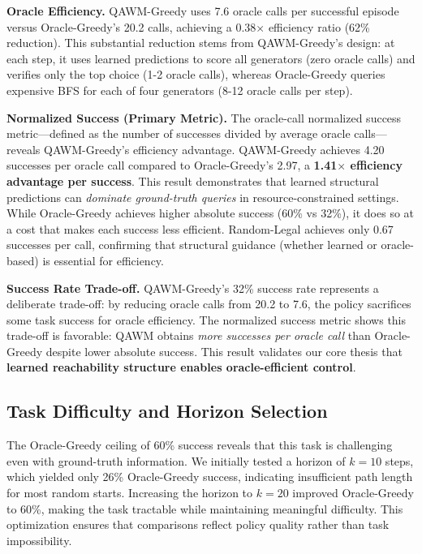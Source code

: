 \textbf{Oracle Efficiency.} QAWM-Greedy uses 7.6 oracle calls per successful episode versus Oracle-Greedy's 20.2 calls, achieving a 0.38$\times$ efficiency ratio (62\% reduction). This substantial reduction stems from QAWM-Greedy's design: at each step, it uses learned predictions to score all generators (zero oracle calls) and verifies only the top choice (1-2 oracle calls), whereas Oracle-Greedy queries expensive BFS for each of four generators (8-12 oracle calls per step).

\textbf{Normalized Success (Primary Metric).} The oracle-call normalized success metric—defined as the number of successes divided by average oracle calls—reveals QAWM-Greedy's efficiency advantage. QAWM-Greedy achieves 4.20 successes per oracle call compared to Oracle-Greedy's 2.97, a \textbf{1.41$\times$ efficiency advantage per success}. This result demonstrates that learned structural predictions can \textit{dominate ground-truth queries} in resource-constrained settings. While Oracle-Greedy achieves higher absolute success (60\% vs 32\%), it does so at a cost that makes each success less efficient. Random-Legal achieves only 0.67 successes per call, confirming that structural guidance (whether learned or oracle-based) is essential for efficiency.

\textbf{Success Rate Trade-off.} QAWM-Greedy's 32\% success rate represents a deliberate trade-off: by reducing oracle calls from 20.2 to 7.6, the policy sacrifices some task success for oracle efficiency. The normalized success metric shows this trade-off is favorable: QAWM obtains \textit{more successes per oracle call} than Oracle-Greedy despite lower absolute success. This result validates our core thesis that \textbf{learned reachability structure enables oracle-efficient control}.

\subsection{Task Difficulty and Horizon Selection}

The Oracle-Greedy ceiling of 60\% success reveals that this task is challenging even with ground-truth information. We initially tested a horizon of $k=10$ steps, which yielded only 26\% Oracle-Greedy success, indicating insufficient path length for most random starts. Increasing the horizon to $k=20$ improved Oracle-Greedy to 60\%, making the task tractable while maintaining meaningful difficulty. This optimization ensures that comparisons reflect policy quality rather than task impossibility.

